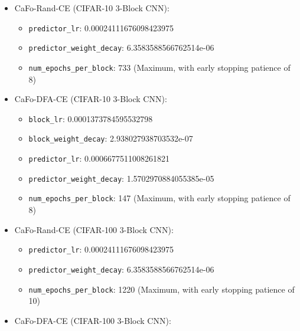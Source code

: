 \documentclass[11pt, english]{article}
\begin{document}
\begin{itemize}
\begin{itemize}
\begin{itemize}
                     \item \texttt{predictor\_weight\_decay}: 3.967605077052991e-05
                     \item \texttt{num\_epochs\_per\_block}: 85 (Maximum, with early stopping patience of 6)
                 \end{itemize}
             \item CaFo-Rand-CE (CIFAR-10 3-Block CNN):
                 \begin{itemize}
                     \item \texttt{predictor\_lr}: 0.00024111676098423975
                     \item \texttt{predictor\_weight\_decay}: 6.3583588566762514e-06
                     \item \texttt{num\_epochs\_per\_block}: 733 (Maximum, with early stopping patience of 8)
                 \end{itemize}
             \item CaFo-DFA-CE (CIFAR-10 3-Block CNN):
                 \begin{itemize}
                     \item \texttt{block\_lr}: 0.0001373784595532798
                     \item \texttt{block\_weight\_decay}: 2.938027938703532e-07
                     \item \texttt{predictor\_lr}: 0.0006677511008261821
                     \item \texttt{predictor\_weight\_decay}: 1.5702970884055385e-05
                     \item \texttt{num\_epochs\_per\_block}: 147 (Maximum, with early stopping patience of 8)
                 \end{itemize}
             \item CaFo-Rand-CE (CIFAR-100 3-Block CNN):
                 \begin{itemize}
                     \item \texttt{predictor\_lr}: 0.00024111676098423975
                     \item \texttt{predictor\_weight\_decay}: 6.3583588566762514e-06
                     \item \texttt{num\_epochs\_per\_block}: 1220 (Maximum, with early stopping patience of 10)
                 \end{itemize}
             \item CaFo-DFA-CE (CIFAR-100 3-Block CNN):
                 \begin{itemize}

\end{itemize}
\end{itemize}
\end{itemize}
\end{document}
